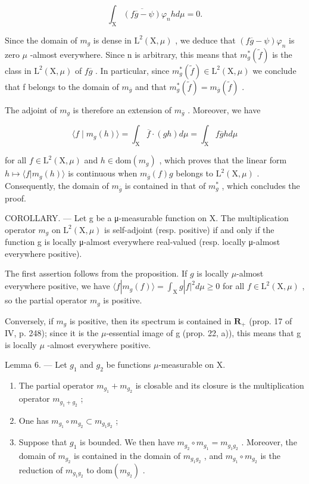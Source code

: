 \[
\int_ {\mathrm{X}} \overline {{(f \overline {{g}} - \psi)}} \varphi_ {n} h d \mu = 0.
\]

Since the domain of \(m_{g}\) is dense in \(\mathrm{L}^{2}(\mathrm{X},\mu)\) , we deduce that \((f\overline{g}-\psi)\varphi_{n}\) is zero \(\mu\) -almost everywhere. Since n is arbitrary, this means that \(m_{g}^{*}(\widetilde{f})\) is the class in \(\mathrm{L}^{2}(\mathrm{X},\mu)\) of \(f\overline{g}\) . In particular, since \(m_{g}^{*}(\widetilde{f}) \in \mathrm{L}^{2}(\mathrm{X},\mu)\) we conclude that f belongs to the domain of \(m_{\overline{g}}\) and that \(m_{g}^{*}(\widetilde{f}) = m_{\overline{g}}(\widetilde{f})\) .

The adjoint of \(m_{g}\) is therefore an extension of \(m_{\overline{g}}\) . Moreover, we have

\[
\langle f \mid m _ {g} (h) \rangle = \int_ {\mathrm{X}} \overline {{f}} \cdot (g h) d \mu = \int_ {\mathrm{X}} f \overline {{g}} h d \mu
\]

for all \(f \in \mathrm{L}^{2}(\mathrm{X}, \mu)\) and \(h \in \mathrm{dom}(m_{g})\) , which proves that the linear form \(h \mapsto \langle f | m_{g}(h) \rangle\) is continuous when \(m_{\overline{g}}(f) g\) belongs to \(\mathrm{L}^{2}(\mathrm{X}, \mu)\) . Consequently, the domain of \(m_{\overline{g}}\) is contained in that of \(m_{g}^{*}\) , which concludes the proof.

COROLLARY. --- Let g be a μ-measurable function on X. The multiplication operator \(m_{g}\) on \(\mathrm{L}^{2}(\mathrm{X},\mu)\) is self-adjoint (resp. positive) if and only if the function g is locally μ-almost everywhere real-valued (resp. locally μ-almost everywhere positive).

The first assertion follows from the proposition. If \(g\) is locally \(\mu\)-almost everywhere positive, we have \(\langle f|m_{g}(f)\rangle=\int_{\mathrm{X}}g|f|^{2}d\mu\geqslant0\) for all \(f\in\mathrm{L}^{2}(\mathrm{X},\mu)\) , so the partial operator \(m_{g}\) is positive.

Conversely, if \(m_{g}\) is positive, then its spectrum is contained in \(\mathbf{R}_{+}\) (prop. 17 of IV, p. 248); since it is the \(\mu\)-essential image of g (prop. 22, a)), this means that g is locally \(\mu\) -almost everywhere positive.

Lemma 6. --- Let \(g_{1}\) and \(g_{2}\) be functions \(\mu\)-measurable on X.

\begin{enumerate}
\def\labelenumi{\alph{enumi})}
\item
  The partial operator \(m_{g_{1}} + m_{g_{2}}\) is closable and its closure is the multiplication operator \(m_{g_{1}+g_{2}}\) ;
\item
  One has \(m_{g_{1}} \circ m_{g_{2}} \subset m_{g_{1}g_{2}}\) ;
\item
  Suppose that \(g_{1}\) is bounded. We then have \(m_{g_{2}} \circ m_{g_{1}} = m_{g_{1}g_{2}}\) . Moreover, the domain of \(m_{g_{2}}\) is contained in the domain of \(m_{g_{1}g_{2}}\) , and \(m_{g_{1}} \circ m_{g_{2}}\) is the reduction of \(m_{g_{1}g_{2}}\) to \(\text{dom}(m_{g_{2}})\) .
\end{enumerate}


